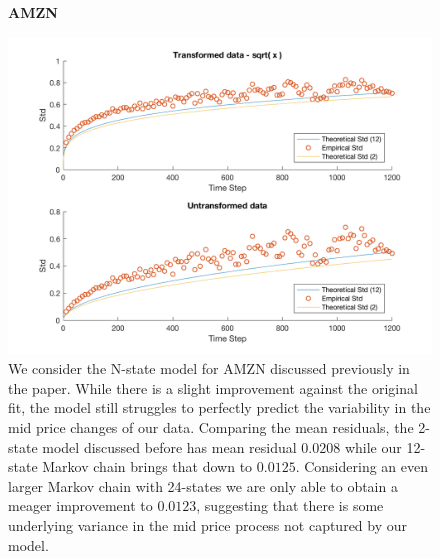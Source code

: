 \begin{figure}
    \centering
    
    \caption*{\textbf{AMZN}}
    \includegraphics[width=\textwidth]{N_State_Plots/AMZN_N_State.png}
    
    \caption{\label{fig:AMZN_data} We consider the N-state model for AMZN discussed previously in the paper. While there is a slight improvement against the original fit, the model still struggles to perfectly predict the variability in the mid price changes of our data. Comparing the mean residuals, the 2-state model discussed before has mean residual $0.0208$ while our 12-state Markov chain brings that down to $0.0125$. Considering an even larger Markov chain with 24-states we are only able to obtain a meager improvement to $0.0123$, suggesting that there is some underlying variance in the mid price process not captured by our model.}
    
\end{figure}